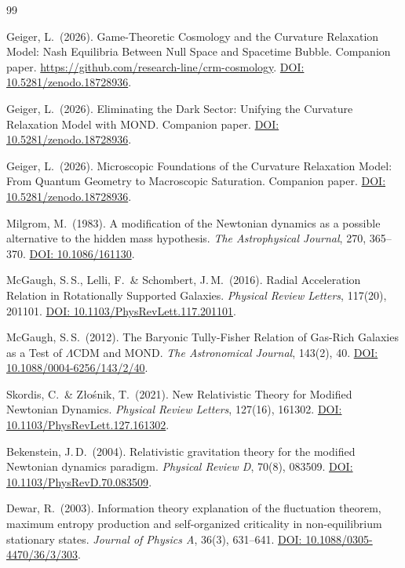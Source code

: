 \documentclass[aps,prd,twocolumn,superscriptaddress,nofootinbib]{revtex4-2}
\begin{document}
\begin{thebibliography}{99}

Geiger, L.\ (2026).
Game-Theoretic Cosmology and the Curvature Relaxation Model: Nash Equilibria Between Null Space and Spacetime Bubble.
Companion paper. \url{https://github.com/research-line/crm-cosmology}.
\href{https://doi.org/10.5281/zenodo.18728936}{DOI: 10.5281/zenodo.18728936}.

Geiger, L.\ (2026).
Eliminating the Dark Sector: Unifying the Curvature Relaxation Model with MOND.
Companion paper.
\href{https://doi.org/10.5281/zenodo.18728936}{DOI: 10.5281/zenodo.18728936}.

Geiger, L.\ (2026).
Microscopic Foundations of the Curvature Relaxation Model: From Quantum Geometry to Macroscopic Saturation.
Companion paper.
\href{https://doi.org/10.5281/zenodo.18728936}{DOI: 10.5281/zenodo.18728936}.

Milgrom, M.\ (1983).
A modification of the Newtonian dynamics as a possible alternative to the hidden mass hypothesis.
\textit{The Astrophysical Journal}, 270, 365--370.
\href{https://doi.org/10.1086/161130}{DOI: 10.1086/161130}.

McGaugh, S.\,S., Lelli, F.\ \& Schombert, J.\,M.\ (2016).
Radial Acceleration Relation in Rotationally Supported Galaxies.
\textit{Physical Review Letters}, 117(20), 201101.
\href{https://doi.org/10.1103/PhysRevLett.117.201101}{DOI: 10.1103/PhysRevLett.117.201101}.

McGaugh, S.\,S.\ (2012).
The Baryonic Tully-Fisher Relation of Gas-Rich Galaxies as a Test of $\Lambda$CDM and MOND.
\textit{The Astronomical Journal}, 143(2), 40.
\href{https://doi.org/10.1088/0004-6256/143/2/40}{DOI: 10.1088/0004-6256/143/2/40}.

Skordis, C.\ \& Z{\l}o\'snik, T.\ (2021).
New Relativistic Theory for Modified Newtonian Dynamics.
\textit{Physical Review Letters}, 127(16), 161302.
\href{https://doi.org/10.1103/PhysRevLett.127.161302}{DOI: 10.1103/PhysRevLett.127.161302}.

Bekenstein, J.\,D.\ (2004).
Relativistic gravitation theory for the modified Newtonian dynamics paradigm.
\textit{Physical Review D}, 70(8), 083509.
\href{https://doi.org/10.1103/PhysRevD.70.083509}{DOI: 10.1103/PhysRevD.70.083509}.

Dewar, R.\ (2003).
Information theory explanation of the fluctuation theorem, maximum entropy production and self-organized criticality in non-equilibrium stationary states.
\textit{Journal of Physics A}, 36(3), 631--641.
\href{https://doi.org/10.1088/0305-4470/36/3/303}{DOI: 10.1088/0305-4470/36/3/303}.


\end{thebibliography}
\end{document}

